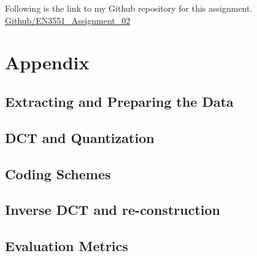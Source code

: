 \documentclass[11pt,a4paper]{article}
\begin{document}
Following is the link to my Github repository for this assignment.\\

\href{https://github.com/Vgr20/EN3551_Assignment_02.git}{Github/EN3551\_Assignment\_02}


\newpage

\twocolumn
\section{Appendix}

\subsection{Extracting and Preparing the Data}

\lstset{style=mystyle}


\subsection{DCT and Quantization}

\lstset{style=mystyle}


\subsection{Coding Schemes}

\lstset{style=mystyle}


\subsection{Inverse DCT and re-construction}

\lstset{style=mystyle}


\subsection{Evaluation Metrics}

\lstset{style=mystyle}

\end{document}
